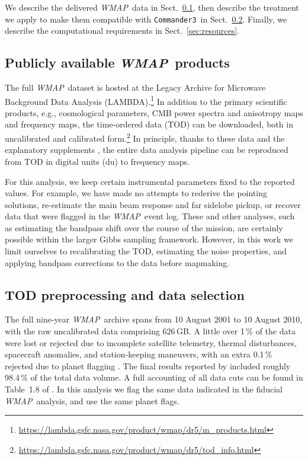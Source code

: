 \documentclass[twocolumn]{../../common/aa}
\def\WMAP{\emph{WMAP}}
\def\commanderthree{\texttt{Commander3}}
\begin{document}
We describe the delivered \WMAP\ data in Sect.~\ref{sec:products}, then describe the treatment we apply to make them compatible with \commanderthree\ in Sect.~\ref{sec:preprocessing}. Finally, we describe the computational requirements in Sect.~\ref{sec:resources}.


\subsection{Publicly available \WMAP\ products}
\label{sec:products}

The full \WMAP\ dataset is hosted at the Legacy Archive for Microwave Background Data Analysis (LAMBDA).\footnote{\url{https://lambda.gsfc.nasa.gov/product/wmap/dr5/m_products.html}} In addition to the primary scientific products, e.g., cosmological parameters, CMB power spectra and anisotropy maps and frequency maps, the time-ordered data (TOD) can be downloaded, both in uncalibrated and calibrated form.\footnote{\url{https://lambda.gsfc.nasa.gov/product/wmap/dr5/tod_info.html}} In principle, thanks to these data and the explanatory supplements \citep{wmapexsupp}, the entire data analysis pipeline can be reproduced from TOD in digital units (du) to frequency maps.

For this analysis, we keep certain instrumental parameters fixed to the reported values. For example, we have made no attempts to rederive the pointing solutions, re-estimate the main beam response and far sidelobe pickup, or recover data that were flagged in the \WMAP\ event log. These and other analyses, such as estimating the bandpass shift over the course of the mission, are certainly possible within the larger Gibbs sampling framework. However, in this work we limit ourselves to recalibrating the TOD, estimating the noise properties, and applying bandpass corrections to the data before mapmaking.

\subsection{TOD preprocessing and data selection}
\label{sec:preprocessing}


The full nine-year \WMAP\ archive spans from 10 August 2001 to 10 August 2010, with the raw uncalibrated data comprising 626\,GB. A little over 1\,\% of the data were lost or rejected due to incomplete satellite telemetry, thermal disturbances, spacecraft anomalies, and station-keeping maneuvers, with an extra 0.1\,\% rejected due to planet flagging \citep{bennett2003a,hinshaw2007,hinshaw2009,bennett2012}. 
The final results reported by \citet{bennett2012} included roughly 98.4\,\% of the total data volume.
A full accounting of all data cuts can be found in Table~1.8 of \citet{wmapexsupp}. In this analysis we flag the same data indicated in the fiducial \WMAP\ analysis, and use the same planet flags.
\end{document}
